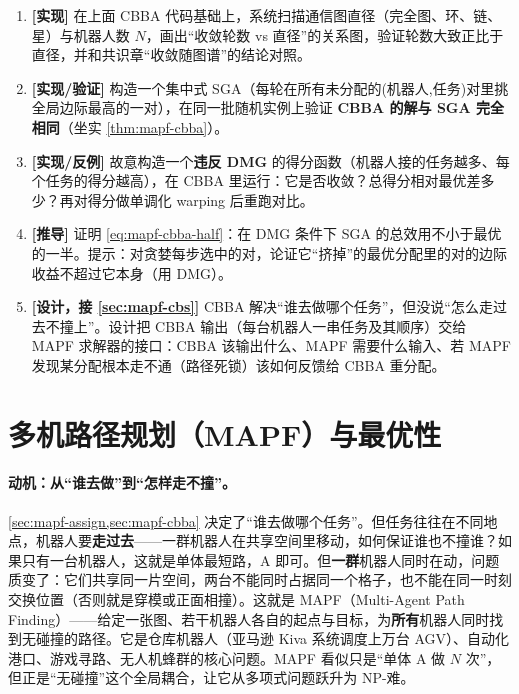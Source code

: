 \begin{exercise}
\begin{enumerate}
  \item \textbf{[实现]} 在上面 CBBA 代码基础上，系统扫描通信图直径（完全图、环、链、星）与机器人数 $N$，画出“收敛轮数 vs 直径”的关系图，验证轮数大致正比于直径，并和共识章“收敛随图谱”的结论对照。
  \item \textbf{[实现/验证]} 构造一个集中式 SGA（每轮在所有未分配的(机器人,任务)对里挑全局边际最高的一对），在同一批随机实例上验证 \textbf{CBBA 的解与 SGA 完全相同}（坐实 \cref{thm:mapf-cbba}）。
  \item \textbf{[实现/反例]} 故意构造一个\textbf{违反 DMG} 的得分函数（机器人接的任务越多、每个任务的得分越高），在 CBBA 里运行：它是否收敛？总得分相对最优差多少？再对得分做单调化 warping 后重跑对比。
  \item \textbf{[推导]} 证明 \cref{eq:mapf-cbba-half}：在 DMG 条件下 SGA 的总效用不小于最优的一半。提示：对贪婪每步选中的对，论证它“挤掉”的最优分配里的对的边际收益不超过它本身（用 DMG）。
  \item \textbf{[设计，接 \cref{sec:mapf-cbs}]} CBBA 解决“谁去做哪个任务”，但没说“怎么走过去不撞上”。设计把 CBBA 输出（每台机器人一串任务及其顺序）交给 MAPF 求解器的接口：CBBA 该输出什么、MAPF 需要什么输入、若 MAPF 发现某分配根本走不通（路径死锁）该如何反馈给 CBBA 重分配。
\end{enumerate}
\end{exercise}

\section{多机路径规划（MAPF）与最优性}
\label{sec:mapf-def}

\paragraph{动机：从“谁去做”到“怎样走不撞”。}
\cref{sec:mapf-assign,sec:mapf-cbba} 决定了“谁去做哪个任务”。但任务往往在不同地点，机器人要\textbf{走过去}——一群机器人在共享空间里移动，如何保证谁也不撞谁？如果只有一台机器人，这就是单体最短路，A\* 即可。但\textbf{一群}机器人同时在动，问题质变了：它们共享同一片空间，两台不能同时占据同一个格子，也不能在同一时刻交换位置（否则就是穿模或正面相撞）。这就是 MAPF（Multi-Agent Path Finding）——给定一张图、若干机器人各自的起点与目标，为\textbf{所有}机器人同时找到无碰撞的路径。它是仓库机器人（亚马逊 Kiva 系统调度上万台 AGV）、自动化港口、游戏寻路、无人机蜂群的核心问题。MAPF 看似只是“单体 A\* 做 $N$ 次”，但正是“无碰撞”这个全局耦合，让它从多项式问题跃升为 NP-难。

